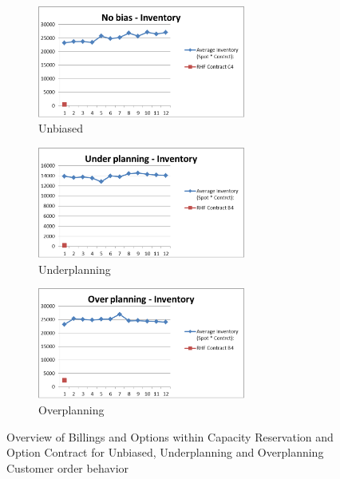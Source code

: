 \documentclass[12pt,english]{article}
\begin{document}
\begin{figure}
\begin{subfigure}{\textwidth}
  \centering
  \includegraphics[width=0.75\textwidth]{Figures/Inventory_Unbiased.eps}
  \caption{Unbiased}
  \label{fig:sfig1}
\end{subfigure}%

\begin{subfigure}{\textwidth}
  \centering
  \includegraphics[width=0.75\textwidth]{Figures/Inventory_Underplanning.eps}
  \caption{Underplanning}
  \label{fig:sfig2}
\end{subfigure}

\begin{subfigure}{\textwidth}
  \centering
  \includegraphics[width=0.75\textwidth]{Figures/Inventory_Overplanning.eps}
  \caption{Overplanning}
  \label{fig:sfig2}
\end{subfigure}
\caption{Overview of Billings and Options within
 Capacity Reservation and Option Contract for Unbiased, Underplanning
 and Overplanning Customer order behavior}
\label{fig:Overview-of-Option}
\end{figure}
\end{document}

